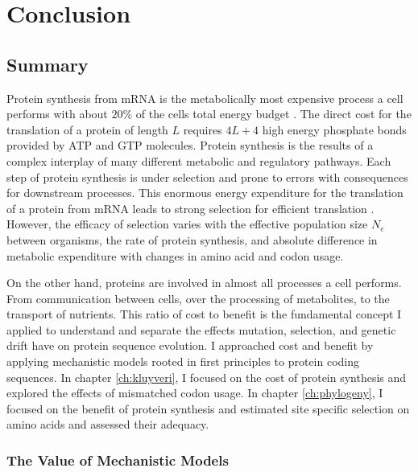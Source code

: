 \chapter{Conclusion} \label{ch:conclusion}
\section{Summary}

Protein synthesis from mRNA is the metabolically most expensive process a cell performs with about $20 \%$ of the cells total energy budget \citep{Reeds1985,WaterlowAndMillward1989}.
The direct cost for the translation of a protein of length $L$ requires $4L+4$ high energy phosphate bonds provided by ATP and GTP molecules.
Protein synthesis is the results of a complex interplay of many different metabolic and regulatory pathways.
Each step of protein synthesis is under selection and prone to errors with consequences for downstream processes. %
This enormous energy expenditure for the translation of a protein from mRNA leads to strong selection for efficient translation \citep{gilchrist2007, DrummondAndWilke2008, gilchrist2009, ShahAndGilchrist2011, gilchrist2015}.
However, the efficacy of selection varies with the effective population size $N_e$ between organisms, the rate of protein synthesis, and absolute difference in metabolic expenditure with changes in amino acid and codon usage.

On the other hand, proteins are involved in almost all processes a cell performs.
From communication between cells, over the processing of metabolites, to the transport of nutrients.
This ratio of cost to benefit is the fundamental concept I applied to understand and separate the effects mutation, selection, and genetic drift have on protein sequence evolution.
I approached cost and benefit by applying mechanistic models rooted in first principles to protein coding sequences.
In chapter \ref{ch:kluyveri}, I focused on the cost of protein synthesis and explored the effects of mismatched codon usage.
In chapter \ref{ch:phylogeny}, I focused on the benefit of protein synthesis and estimated site specific selection on amino acids and assessed their adequacy.


\subsection{The Value of Mechanistic Models}


